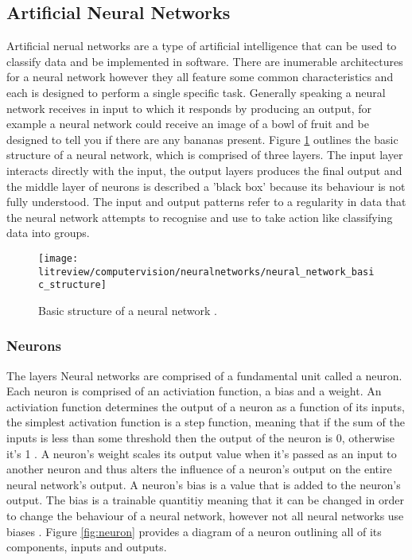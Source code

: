 \subsection{Artificial Neural Networks}

Artificial nerual networks are a type of artificial intelligence that can be used to classify data and be implemented in software. There are inumerable architectures for a neural network however they all feature some common characteristics and each is designed to perform a single specific task. Generally speaking a neural network receives in input to which it responds by producing an output, for example a neural network could receive an image of a bowl of fruit and be designed to tell you if there are any bananas present. Figure \ref{fig:neural_network} outlines the basic structure of a neural network, which is comprised of three layers. The input layer interacts directly with the input, the output layers produces the final output and the middle layer of neurons is described a 'black box' because its behaviour is not fully understood. The input and output patterns refer to a regularity in data that the neural network attempts to recognise and use to take action like classifying data into groups\cite{statistical_pattern_recognition}. 


\begin{figure}[h]
    \centering
    \texttt{[image: litreview/computervision/neuralnetworks/neural\_network\_basic\_structure]}
    \caption{Basic structure of a neural network \cite{neural_networks}.}
    \label{fig:neural_network}
\end{figure}

\subsubsection{Neurons}

The layers Neural networks are comprised of a fundamental unit called a neuron. Each neuron is comprised of an activiation function, a bias and a weight. An activiation function determines the output of a neuron as a function of its inputs, the simplest activation function is a step function, meaning that if the sum of the inputs is less than some threshold then the output of the neuron is 0, otherwise it's 1 \cite{machine_learning_dictionary}. A neuron's weight scales its output value when it's passed as an input to another neuron and thus alters the influence of a neuron's output on the entire neural network's output. A neuron's bias is a value that is added to the neuron's output. The bias is a trainable quantitiy meaning that it can be changed in order to change the behaviour of a neural network, however not all neural networks use biases \cite{neural_networks}. Figure \ref{fig:neuron} provides a diagram of a neuron outlining all of its components, inputs and outputs. 


